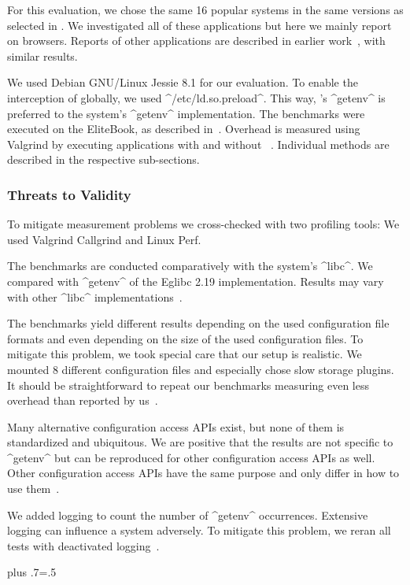 For this evaluation, we chose the same 16 popular systems in the same versions as selected in .
We investigated all of these applications but here we mainly report on browsers.
Reports of other applications are described in earlier work~\cite{raab2016unanticipated,raab2017introducing}, with similar results.

We used Debian GNU/Linux Jessie 8.1 for our evaluation.
To enable the interception of \elektra{} globally, we used ^/etc/ld.so.preload^.
This way, \elektra{}'s ^getenv^ is preferred to the system's ^getenv^ implementation.
The benchmarks were executed on the EliteBook, as described in~.
Overhead is measured using Valgrind by executing applications with and without \elektra{}~\cite{raab2016unanticipated}.
Individual methods are described in the respective sub-sections.



\subsubsection{Threats to Validity}

To mitigate measurement problems we cross-checked with two profiling tools:
We used Valgrind Callgrind and Linux Perf.

The benchmarks are conducted comparatively with the system's ^libc^.
We compared with ^getenv^ of the Eglibc 2.19 implementation.
Results may vary with other ^libc^ implementations~\cite{raab2017introducing}.

The benchmarks yield different results depending on the used configuration file formats and even depending on the size of the used configuration files.
To mitigate this problem, we took special care that our setup is realistic.
We mounted 8 different configuration files and especially chose slow storage plugins.
It should be straightforward to repeat our benchmarks measuring even less overhead than reported by us~\cite{raab2016unanticipated}.

Many alternative configuration access APIs exist, but none of them is standardized and ubiquitous.
We are positive that the results are not specific to ^getenv^ but can be reproduced for other configuration access APIs as well.
Other configuration access APIs have the same purpose and only differ in how to use them~\cite{raab2016unanticipated}.

We added logging to count the number of ^getenv^ occurrences.
Extensive logging can influence a system adversely.
To mitigate this problem, we reran all tests with deactivated logging~\cite{raab2016unanticipated}.%
{\parfillskip=0pt plus .7\textwidth \emergencystretch=.5\textwidth \par}


